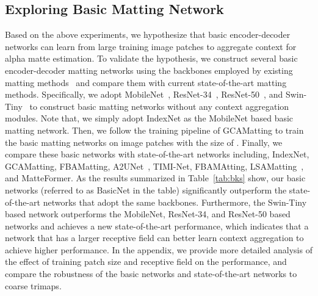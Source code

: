 \documentclass[10pt,twocolumn,letterpaper]{article}
\begin{document}
\subsection{Exploring Basic Matting Network}
\label{sec:33}
Based on the above experiments, we hypothesize that basic encoder-decoder networks can learn from large training image patches to aggregate context for alpha matte estimation. 
To validate the hypothesis, we construct several basic encoder-decoder matting networks using the backbones employed by existing matting methods~\cite{lu2019indices,li2020natural,dai2021learning,forte2020fbamatting,park2022matteformer} and compare them with current state-of-the-art matting methods. 
Specifically, we adopt MobileNet~\cite{sandler2018mobilenetv2}, ResNet-34~\cite{he2016deep}, ResNet-50~\cite{he2016deep}, and Swin-Tiny~\cite{liu2021Swin} to construct basic matting networks without any context aggregation modules.
Note that, we simply adopt IndexNet as the MobileNet based basic matting network.
Then, we follow the training pipeline of GCAMatting to train the basic matting networks on image patches with the size of .
Finally, we compare these basic networks with state-of-the-art networks including, IndexNet, GCAMatting, FBAMatting, A2UNet~\cite{dai2021learning}, TIMI-Net, FBAMAtting, LSAMatting~\cite{lsam}, and MatteFormer.
As the results summarized in Table~\ref{tab:bks} show, our basic networks (referred to as BasicNet in the table)  significantly outperform the state-of-the-art networks that adopt the same backbones. 
Furthermore, the Swin-Tiny based network outperforms the MobileNet, ResNet-34, and ResNet-50 based networks and achieves a new state-of-the-art performance, which indicates that a network that has a larger receptive field can better learn context aggregation to achieve higher performance.
In the appendix, we provide more detailed analysis of the effect of training patch size and receptive field on the performance, and compare the robustness of the basic networks and state-of-the-art networks to coarse trimaps.
\end{document}
